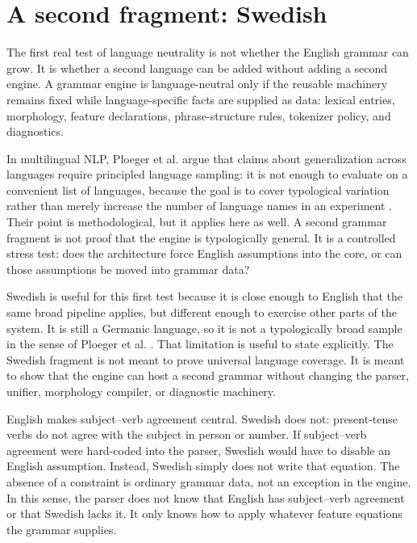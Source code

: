 \documentclass[11pt]{article}
\theoremstyle{definition}
\theoremstyle{plain}
\theoremstyle{remark}
\begin{document}
\section{A second fragment: Swedish}

The first real test of language neutrality is not whether the English grammar can
grow. It is whether a second language can be added without adding a second
engine. A grammar engine is language-neutral only if the reusable machinery
remains fixed while language-specific facts are supplied as data: lexical
entries, morphology, feature declarations, phrase-structure rules, tokenizer
policy, and diagnostics.

In multilingual NLP, Ploeger et al. argue that
claims about generalization across languages require principled language
sampling: it is not enough to evaluate on a convenient list of languages, because
the goal is to cover typological variation rather than merely increase the
number of language names in an experiment \cite{ploeger2025typdiv}. Their point
is methodological, but it applies here as well. A second grammar fragment is not
proof that the engine is typologically general. It is a controlled stress test:
does the architecture force English assumptions into the core, or can those
assumptions be moved into grammar data?

Swedish is useful for this first test because it is close enough to English that
the same broad pipeline applies, but different enough to exercise other parts of
the system. It is still a Germanic language, so it is not a typologically broad
sample in the sense of Ploeger et al. \cite{ploeger2025typdiv}. That limitation
is useful to state explicitly. The Swedish fragment is not meant to prove
universal language coverage. It is meant to show that the engine can host a
second grammar without changing the parser, unifier, morphology compiler, or
diagnostic machinery.

English makes subject--verb agreement central. Swedish does not: present-tense
verbs do not agree with the subject in person or number. If subject--verb
agreement were hard-coded into the parser, Swedish would have to disable an
English assumption. Instead, Swedish simply does not write that equation. The
absence of a constraint is ordinary grammar data, not an exception in the
engine. In this sense, the parser does not know that English has subject--verb
agreement or that Swedish lacks it. It only knows how to apply whatever feature
equations the grammar supplies.
\end{document}
